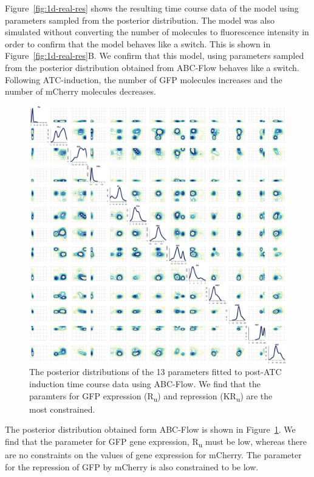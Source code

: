 Figure~\ref{fig:1d-real-res} shows the resulting time course data of the model using parameters sampled from the posterior distribution. The model was also simulated without converting the number of molecules to fluorescence intensity in order to confirm that the model behaves like a switch. This is shown in Figure~\ref{fig:1d-real-res}B. We confirm that this model, using parameters sampled from the posterior distribution obtained from ABC-Flow behaves like a switch. Following ATC-induction, the number of GFP molecules increases and the number of mCherry molecules decreases. 

\begin{figure}[tb]
\centerfloat
	\includegraphics[width=\textwidth]{../../chapters/chapterABCFlow/images/real_data_stuff/posterior2D_pop10_100p-ATc.pdf}
	\caption[LoF caption]{\label{fig:1atc-post} The posterior distributions of the 13 parameters fitted to post-ATC induction time course data using ABC-Flow. We find that the paramters for GFP expression (R\textsubscript{u}) and repression (KR\textsubscript{u}) are the most constrained.}
\end{figure}


The posterior distribution obtained form ABC-Flow is shown in Figure~\ref{fig:1atc-post}. We find that the parameter for GFP gene expression, R\textsubscript{u} must be low, whereas there are no constraints on the values of gene expression for mCherry. The parameter for the repression of GFP by mCherry is also constrained to be low. 



